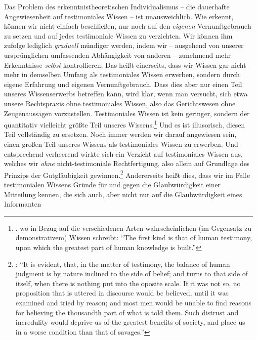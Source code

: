 Das Problem des erkenntnistheoretischen Individualismus -- die dauerhafte
Angewiesenheit auf testimoniales Wissen -- ist unausweichlich. Wie
 erkennt, können wir nicht einfach beschließen, nur noch auf
den \emph{eigenen} Vernunftgebrauch zu setzen und auf jedes testimoniale Wissen zu
verzichten. Wir können ihm zufolge lediglich \emph{graduell} mündiger werden,
indem wir -- ausgehend von unserer ursprünglichen umfassenden Abhängigkeit von anderen --
zunehmend mehr Erkenntnisse \emph{selbst} kontrollieren. Das heißt einerseits,
dass wir Wissen gar nicht mehr in demselben Umfang als testimoniales
Wissen erwerben, sondern durch eigene Erfahrung und eigenen Vernunftgebrauch.
Dass dies aber nur einen Teil unseres Wissenserwerbs betreffen kann, wird klar,
wenn man versucht, sich etwa unsere Rechtspraxis ohne testimoniales Wissen, also
das Gerichtswesen ohne Zeugenaussagen vorzustellen. Testimoniales Wissen ist
kein geringer, sondern der quantitativ vielleicht größte Teil unseres
Wissens.\footnote{\cite[Vgl.][557]{Reid:EssaysontheIntellectualPowersofMan2002},
wo  in Bezug auf die verschiedenen Arten wahrscheinlichen (im
Gegensatz zu demonstrativem) Wissen schreibt: \enquote{The first kind is that of
human testimony, upon which the greatest part of human knowledge is built.}} Und
es ist illusorisch, diesen Teil vollständig zu ersetzen. Noch immer werden wir
darauf angewiesen sein, einen großen Teil unseres Wissens als testimoniales
Wissen zu erwerben. Und entsprechend verheerend wirkte sich ein Verzicht auf
testimoniales Wissen aus, welches wir \emph{ohne} nicht-testimoniale
Rechtfertigung, also allein auf Grundlage des Prinzips der Gutgläubigkeit
gewinnen.\footnote{\cite[Vgl.][194]{Reid:AnInquiryIntotheHumanMindonthePrinciplesofCommonSense1997}:
\enquote{It is evident, that, in the matter of testimony, the balance of human
judgment is by nature inclined to the side of belief; and turns to that side of
itself, when there is nothing put into the oposite scale. If it was not so, no
proposition that is uttered in discourse would be believed, until it was
examined and tried by reason; and most men would be unable to find reasons for
believing the thousandth part of what is told them. Such distrust and
incredulity would deprive us of the greatest benefits of society, and place us
in a worse condition than that of savages.}} Andererseits heißt dies, dass wir
im Falle testimonialen Wissens Gründe für und gegen die Glaubwürdigkeit einer
Mitteilung kennen, die sich auch, aber nicht nur auf die Glaubwürdigkeit eines
Informanten
